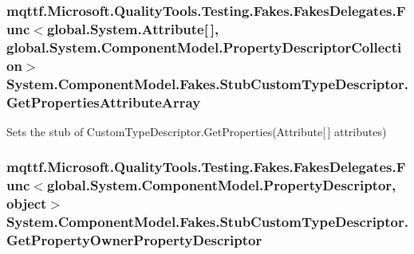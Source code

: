 \hypertarget{class_system_1_1_component_model_1_1_fakes_1_1_stub_custom_type_descriptor_a6b72cf544557e2731a5fc95c011371ee}{
\subsubsection[{Get\-Properties\-Attribute\-Array}]{\setlength{\rightskip}{0pt plus 5cm}mqttf.\-Microsoft.\-Quality\-Tools.\-Testing.\-Fakes.\-Fakes\-Delegates.\-Func$<$global.\-System.\-Attribute\mbox{[}$\,$\mbox{]}, global.\-System.\-Component\-Model.\-Property\-Descriptor\-Collection$>$ System.\-Component\-Model.\-Fakes.\-Stub\-Custom\-Type\-Descriptor.\-Get\-Properties\-Attribute\-Array}}\label{class_system_1_1_component_model_1_1_fakes_1_1_stub_custom_type_descriptor_a6b72cf544557e2731a5fc95c011371ee}


Sets the stub of Custom\-Type\-Descriptor.\-Get\-Properties(\-Attribute\mbox{[}$\,$\mbox{]} attributes)

\hypertarget{class_system_1_1_component_model_1_1_fakes_1_1_stub_custom_type_descriptor_a55adb87fae24805735e50dd6e95d6bf5}{
\subsubsection[{Get\-Property\-Owner\-Property\-Descriptor}]{\setlength{\rightskip}{0pt plus 5cm}mqttf.\-Microsoft.\-Quality\-Tools.\-Testing.\-Fakes.\-Fakes\-Delegates.\-Func$<$global.\-System.\-Component\-Model.\-Property\-Descriptor, object$>$ System.\-Component\-Model.\-Fakes.\-Stub\-Custom\-Type\-Descriptor.\-Get\-Property\-Owner\-Property\-Descriptor}}\label{class_system_1_1_component_model_1_1_fakes_1_1_stub_custom_type_descriptor_a55adb87fae24805735e50dd6e95d6bf5}



